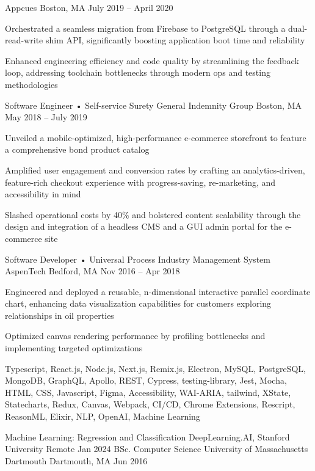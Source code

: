 \documentclass[]{awesome-cv}
\begin{document}
\begin{cventries}
	{Appcues}
	{Boston, MA}
	{July 2019 – April 2020}
	{\begin{cvitems}
		\item {Orchestrated a seamless migration from Firebase to PostgreSQL through a dual-read-write shim API, significantly boosting application boot time and reliability}
		\item {Enhanced engineering efficiency and code quality by streamlining the feedback loop, addressing toolchain bottlenecks through modern ops and testing methodologies}
		\end{cvitems}}
	\cventry
	{Software Engineer • Self-service Surety}
	{General Indemnity Group}
	{Boston, MA}
	{May 2018 – July 2019}
	{\begin{cvitems}
		\item {Unveiled a mobile-optimized, high-performance e-commerce storefront to feature a comprehensive bond product catalog}
		\item {Amplified user engagement and conversion rates by crafting an analytics-driven, feature-rich checkout experience with progress-saving, re-marketing, and accessibility in mind}
		\item {Slashed operational costs by 40\% and bolstered content scalability through the design and integration of a headless CMS and a GUI admin portal for the e-commerce site}
		\end{cvitems}}
	\cventry
	{Software Developer • Universal Process Industry Management System} 
	{AspenTech}
	{Bedford, MA}
	{Nov 2016 – Apr 2018}
	{\begin{cvitems}
		\item {Engineered and deployed a reusable, n-dimensional interactive parallel coordinate chart, enhancing data visualization capabilities for customers exploring relationships in oil properties}
		\item {Optimized canvas rendering performance by profiling bottlenecks and implementing targeted optimizations}
		\end{cvitems}}
\end{cventries}

\vspace{-2mm}

Typescript, React.js, Node.js, Next.js, Remix.js, Electron, MySQL, PostgreSQL, MongoDB, GraphQL, Apollo, REST, Cypress, testing-library, Jest, Mocha, HTML, CSS, Javascript, Figma, Accessibility, WAI-ARIA, tailwind, XState, Statecharts, Redux, Canvas, Webpack, CI/CD, Chrome Extensions, Rescript, ReasonML, Elixir, NLP, OpenAI, Machine Learning

\begin{cvhonors}
	\cvhonor
	{Machine Learning: Regression and Classification}
	{DeepLearning.AI, Stanford University}
	{Remote}
	{Jan 2024}
	\cvhonor
	{BSc. Computer Science}
	{University of Massachusetts Dartmouth}
	{Dartmouth, MA}
	{Jun 2016}
\end{cvhonors}
\end{document}
